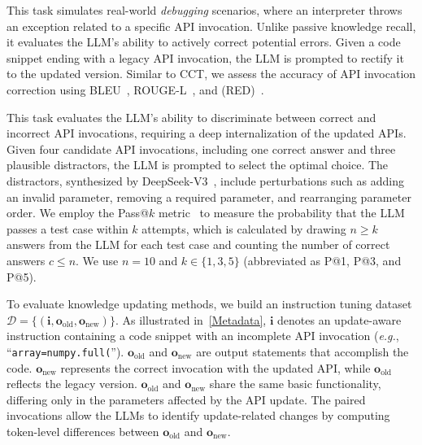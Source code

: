 This task simulates real-world \textit{debugging} scenarios, where an interpreter throws an exception related to a specific API invocation. Unlike passive knowledge recall, it evaluates the LLM's ability to actively correct potential errors. Given a code snippet ending with a legacy API invocation, the LLM is prompted to rectify it to the updated version. Similar to CCT, we assess the accuracy of API invocation correction using BLEU~\cite{papineni2002bleu}, ROUGE-L~\cite{lin2004rouge}, and  (RED)~\cite{ristad1998EditInstance}.

This task evaluates the LLM's ability to discriminate between correct and incorrect API invocations, requiring a deep internalization of the updated APIs. Given four candidate API invocations, including one correct answer and three plausible distractors, the LLM is prompted to select the optimal choice. The distractors, synthesized by DeepSeek-V3~\cite{liu2024deepseekv3}, include perturbations such as adding an invalid parameter, removing a required parameter, and rearranging parameter order. We employ the Pass@$k$ metric~\cite{chen2021codex} to measure the probability that the LLM passes a test case within $k$ attempts, which is calculated by drawing $n \ge k$ answers from the LLM for each test case and counting the number of correct answers $c \le n$. We use $n = 10$ and $k \in \{1, 3, 5\}$ (abbreviated as P@1, P@3, and P@5).

To evaluate knowledge updating methods, we build an instruction tuning dataset $\mathcal{D}=\{(\mathbf{i}, \mathbf{o}_\text{old}, \mathbf{o}_\text{new})\}$. As illustrated in\textcolor{red}{~\autoref{Metadata}}, $\mathbf{i}$ denotes an update-aware instruction containing a code snippet with an incomplete API invocation (\emph{e.g.}, ``\texttt{array=numpy.full(}''). $\mathbf{o}_\text{old}$ and $\mathbf{o}_\text{new}$ are output statements that accomplish the code. $\mathbf{o}_\text{new}$ represents the correct invocation with the updated API, while $\mathbf{o}_\text{old}$ reflects the legacy version. $\mathbf{o}_\text{old}$ and $\mathbf{o}_\text{new}$ share the same basic functionality, differing only in the parameters affected by the API update. The paired invocations allow the LLMs to identify update-related changes by computing token-level differences between $\mathbf{o}_\text{old}$ and $\mathbf{o}_\text{new}$.
